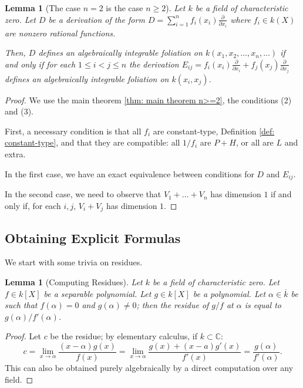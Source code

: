 \documentclass{amsart}
\newtheorem{lemma}[thm]{Lemma}
\theoremstyle{definition}
\begin{document}
\begin{lemma}[The case $n=2$ is the case $n\ge 2$]
    Let $k$ be a field of characteristic zero.
    Let $D$ be a derivation of the form $D= \sum_{i=1}^n f_i(x_i)\frac{\partial}{\partial x_i}$ where $f_i\in k(X)$ are nonzero rational functions.

    Then, $D$ defines an algebraically integrable foliation on $k(x_1,x_2,\ldots,x_n,\ldots)$ if and only if 
    for each $1\le i<j\le n$ the derivation $E_{ij}=f_i(x_i)\frac{\partial}{\partial x_i}+f_j(x_j)\frac{\partial}{\partial x_j}$ defines an algebraically integrable foliation on $k(x_i,x_j)$.
\end{lemma}

\begin{proof}
    We use the main theorem \ref{thm: main theorem n>=2}, the conditions (2) and (3).
    
    First, a necessary condition is that all $f_i$ are constant-type, Definition \ref{def: constant-type}, and that they are compatible: all $1/f_i$ are $P+H$, or all are $L$ and extra. 
    
    In the first case, we have an exact equivalence between conditions for $D$ and $E_{ij}$.

    In the second case, we need to observe that $V_1+\ldots+V_n$ has dimension $1$ if and only if, for each $i,j$, $V_i+V_j$ has dimension $1$.
\end{proof}


\subsection{Obtaining Explicit Formulas} We start with some trivia on residues.

\begin{lemma}[Computing Residues]\label{lem: residues via lhopital}
    Let $k$ be a field of characteristic zero.
    Let $f\in k[X]$ be a separable polynomial. Let $g\in k[X]$ be a polynomial. Let $\alpha\in \overline{k}$ be such that $f(\alpha)=0$ and $g(\alpha)\ne0$; then the residue of $g/f$ at $\alpha$ is equal to $g(\alpha)/f'(\alpha)$.
\end{lemma}

\begin{proof}
Let $c$ be the residue; by elementary calculus, if $k\subset\mathbb{C}$:
\[
c=\lim_{x\to\alpha} \frac{(x-\alpha)g(x)}{f(x)}=\lim_{x\to\alpha} \frac{g(x)+(x-a)g'(x)}{f'(x)}=\frac{g(\alpha)}{f'(\alpha)}.
\]
This can also be obtained purely algebraically by a direct computation over any field.
\end{proof}
\end{document}
